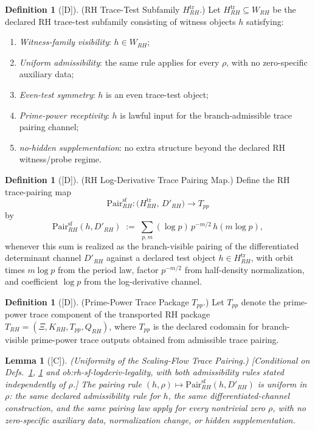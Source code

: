 \documentclass[12pt,oneside]{amsbook}
\theoremstyle{plain}
\newtheorem{lemma}[theorem]{Lemma}
\theoremstyle{definition}
\newtheorem{definition}[theorem]{Definition}
\theoremstyle{remark}
\newcommand{\status}[1]{\textup{[#1]}}
\begin{document}
\begin{definition}[\status{D}]\label{def:rh-trace-test-subfamily}
\textup{(RH Trace-Test Subfamily $H_{RH}^{\mathrm{tr}}$.)}
Let $H_{RH}^{\mathrm{tr}} \subseteq W_{RH}$ be the declared RH
trace-test subfamily consisting of witness objects $h$ satisfying:
\begin{enumerate}[label=\textup{(\arabic*)}]
 \item \emph{Witness-family visibility}: $h \in W_{RH}$;
 \item \emph{Uniform admissibility}: the same rule applies for every
 $\rho$, with no zero-specific auxiliary data;
 \item \emph{Even-test symmetry}: $h$ is an even trace-test object;
 \item \emph{Prime-power receptivity}: $h$ is lawful input for the
 branch-admissible trace pairing channel;
 \item \emph{no-hidden supplementation}: no extra structure beyond
 the declared RH witness/probe regime.
\end{enumerate}
\end{definition}

\begin{definition}[\status{D}]\label{def:rh-logderiv-trace-pairing}
\textup{(RH Log-Derivative Trace Pairing Map.)}
Define the RH trace-pairing map
\[
 \mathrm{Pair}_{RH}^{\mathrm{sf}} :
 \bigl(H_{RH}^{\mathrm{tr}},\, D'_{RH}\bigr)
 \longrightarrow T_{pp}
\]
by
\[
 \mathrm{Pair}_{RH}^{\mathrm{sf}}(h, D'_{RH})
 \;:=\; \sum_{p,m} (\log p)\,p^{-m/2}\,h(m\log p),
\]
whenever this sum is realized as the branch-visible pairing of the
differentiated determinant channel $D'_{RH}$ against a declared test
object $h \in H_{RH}^{\mathrm{tr}}$, with orbit times $m\log p$
from the period law, factor $p^{-m/2}$ from half-density
normalization, and coefficient $\log p$ from the log-derivative
channel.
\end{definition}

\begin{definition}[\status{D}]\label{def:rh-primepower-package}
\textup{(Prime-Power Trace Package $T_{pp}$.)}
Let $T_{pp}$ denote the prime-power trace component of the transported
RH package $T_{RH} = (\Xi, K_{RH}, T_{pp}, Q_{RH})$, where $T_{pp}$
is the declared codomain for branch-visible prime-power trace outputs
obtained from admissible trace pairing.
\end{definition}

\begin{lemma}[\status{C}]\label{lem:rh-sf-trace-uniformity}
\textup{(Uniformity of the Scaling-Flow Trace Pairing.)}
\textup{[Conditional on Defs.~\ref{def:rh-trace-test-subfamily},
\ref{def:rh-logderiv-trace-pairing} and ob:rh-sf-logderiv-legality,
with both admissibility rules stated independently of $\rho$.]}
The pairing rule $(h, \rho) \mapsto \mathrm{Pair}_{RH}^{\mathrm{sf}}
(h, D'_{RH})$ is uniform in $\rho$: the same declared admissibility
rule for $h$, the same differentiated-channel construction, and the
same pairing law apply for every nontrivial zero $\rho$, with no
zero-specific auxiliary data, normalization change, or hidden
supplementation.
\end{lemma}
\end{document}
